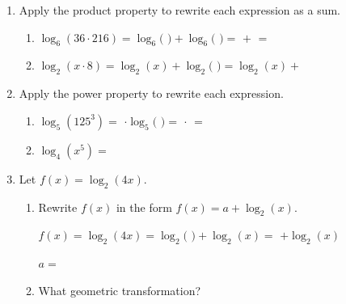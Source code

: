 \documentclass[10pt]{article}
\begin{document}
\namedateperiod

\vspace{0.1in}

\begin{enumerate}[leftmargin=1.8em, itemsep=14pt]

\item Apply the product property to rewrite each expression as a sum.

\begin{enumerate}[leftmargin=1.5em, itemsep=6pt, label=\alph*.]
  \item $\log_6(36 \cdot 216) = \log_6($  $) + \log_6($  $) = $  $+$  $=$ 

  \item $\log_2(x \cdot 8) = \log_2(x) + \log_2($  $) = \log_2(x) +$ 
\end{enumerate}

\item Apply the power property to rewrite each expression.

\begin{enumerate}[leftmargin=1.5em, itemsep=6pt, label=\alph*.]
  \item $\log_5(125^3) = $  $\cdot \log_5($  $) = $  $\cdot$  $=$ 

  \item $\log_4(x^5) = $ 
\end{enumerate}

\item Let $f(x) = \log_2(4x)$.

\begin{enumerate}[leftmargin=1.5em, itemsep=6pt, label=\alph*.]
  \item Rewrite $f(x)$ in the form $f(x) = a + \log_2(x)$.

  \vspace{4pt}
  $f(x) = \log_2(4x) = \log_2($  $) + \log_2(x) = $  $+ \log_2(x)$

  \vspace{2pt}
  $a = $ 

  \item What geometric transformation?

\end{enumerate}


\end{enumerate}
\end{document}
